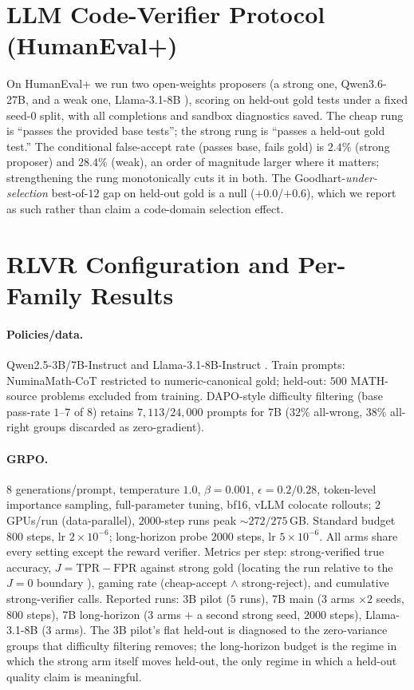 \documentclass[letterpaper]{article} %
\newcommand{\J}{\ensuremath{J}}
\begin{document}
\section{LLM Code-Verifier Protocol (HumanEval+)}\label{supp:code}
On HumanEval+ \citep{evalplus} we run two open-weights proposers (a strong one, Qwen3.6-27B, and a weak one,
Llama-3.1-8B \citep{llama3_2024}), scoring on held-out gold tests under a fixed seed-$0$ split, with all
completions and sandbox diagnostics saved. The cheap rung is ``passes the provided base tests''; the strong
rung is ``passes a held-out gold test.'' The conditional false-accept rate (passes base, fails gold) is
$2.4\%$ (strong proposer) and $28.4\%$ (weak), an order of magnitude larger where it matters; strengthening
the rung monotonically cuts it in both. The Goodhart-\emph{under-selection} best-of-$12$ gap on held-out gold
is a null ($+0.0$/$+0.6$), which we report as such rather than claim a code-domain selection effect.

\section{RLVR Configuration and Per-Family Results}\label{supp:rlvr}
\paragraph{Policies/data.} Qwen2.5-3B/7B-Instruct \citep{qwen25_2024} and Llama-3.1-8B-Instruct
\citep{llama3_2024}. Train prompts: NuminaMath-CoT \citep{numinamath2024} restricted to numeric-canonical
gold; held-out: $500$ MATH-source problems excluded from training. DAPO-style difficulty filtering
\citep{dapo2025} (base pass-rate $1$--$7$ of $8$) retains $7{,}113/24{,}000$ prompts for 7B ($32\%$
all-wrong, $38\%$ all-right groups discarded as zero-gradient).
\paragraph{GRPO.} $8$ generations/prompt, temperature $1.0$, $\beta{=}0.001$, $\epsilon{=}0.2/0.28$,
token-level importance sampling, full-parameter tuning, bf16, vLLM colocate rollouts; $2$ GPUs/run
(data-parallel), $2000$-step runs peak $\sim\!272/275$\,GB. Standard budget $800$ steps, lr
$2{\times}10^{-6}$; long-horizon probe $2000$ steps, lr $5{\times}10^{-6}$. All arms share every setting
except the reward verifier. Metrics per step: strong-verified true accuracy, $\J{=}\mathrm{TPR}-\mathrm{FPR}$
against strong gold (locating the run relative to the $\J{=}0$ boundary \citep{rateorfate2026}), gaming rate
(cheap-accept $\wedge$ strong-reject), and cumulative strong-verifier calls. Reported runs: 3B pilot
($5$ runs), 7B main ($3$ arms $\times2$ seeds, $800$ steps), 7B long-horizon ($3$ arms $+$ a second strong
seed, $2000$ steps), Llama-3.1-8B ($3$ arms). The 3B pilot's flat held-out is diagnosed to the zero-variance
groups that difficulty filtering removes; the long-horizon budget is the regime in which the strong arm
itself moves held-out, the only regime in which a held-out quality claim is meaningful.
\end{document}
